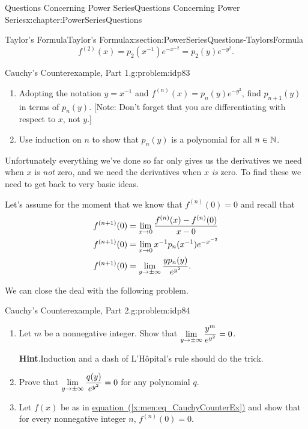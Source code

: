 \begin{chapterptx}{Questions Concerning Power Series}{}{Questions Concerning Power Series}{}{}{x:chapter:PowerSeriesQuestions}
\begin{sectionptx}{Taylor's Formula}{}{Taylor's Formula}{}{}{x:section:PowerSeriesQuestions-TaylorsFormula}
\begin{equation*}
			f^{(2)}(x) = p_2(x^{-1})e^{-x^{-2}} = p_2(y)e^{-y^2}\text{.}
		\end{equation*}
		\begin{problem}{Cauchy's Counterexample, Part 1.}{g:problem:idp83}%
			\begin{enumerate}[font=\bfseries,label=(\alph*),ref=\alph*]
				\item{}Adopting the notation \(y=x^{-1}\) and \(f^{(n)}(x) =p_n(y)e^{-y^2}\), find \(p_{n+1}(y)\) in terms of \(p_{n}(y)\). [Note: Don't forget that you are differentiating with respect to \(x\), not \(y\).]%
				\item{}Use induction on \(n\) to show that \(p_n(y)\) is a polynomial for all \(n\in\mathbb {N}\).%
			\end{enumerate}
		\end{problem}
		Unfortunately everything we've done so far only gives us the derivatives we need when \(x\) is \emph{not} zero, and we need the derivatives when \(x\) \emph{is} zero. To find these we need to get back to very basic ideas.%
		\par
		Let's assume for the moment that we know that \(f^{(n)}(0)=0\) and recall that%
		\begin{align*}
			f^{(n+1)}(0) & = {\displaystyle\lim_{x\rightarrow 0}\frac{f^{(n)}(x)-f^{(n)}(0)}{x-0}}\\
			f^{(n+1)}(0) & = {\displaystyle\lim_{x\rightarrow 0}x^{-1}p_n(x^{-1})e^{-x^{-2}}}\\
			f^{(n+1)}(0) & = {\displaystyle\lim_{y\rightarrow \pm\infty}\frac{yp_n(y)}{e^{y^2}}}\text{.}
		\end{align*}
		\par
		We can close the deal with the following problem.%
		\begin{problem}{Cauchy's Counterexample, Part 2.}{g:problem:idp84}%
			\begin{enumerate}[font=\bfseries,label=(\alph*),ref=\alph*]
				\item{}Let \(m\) be a nonnegative integer. Show that \({\displaystyle\lim_{y\rightarrow \pm\infty}\frac{y^m}{e^{y^2}}}=0\).%
				\par\smallskip%
				\noindent\textbf{\blocktitlefont Hint}.\hypertarget{g:hint:idp85}{}\quad{}Induction and a dash of L'Hôpital's rule should do the trick.%
				\item{}Prove that \({\displaystyle\lim_{y\rightarrow \pm\infty}\frac{q(y)}{e^{y^2}}}=0\) for any polynomial \(q\).%
				\item{}Let \(f(x)\) be as in \hyperref[x:men:eq_CauchyCounterEx]{equation~({\xreffont\ref{x:men:eq_CauchyCounterEx}})} and show that for every nonnegative integer \(n\), \(f^{(n)}(0)=0\).%

\end{enumerate}
\end{problem}
\end{sectionptx}
\end{chapterptx}
